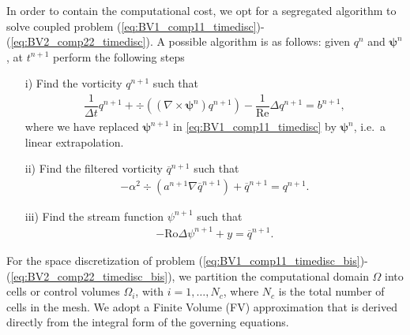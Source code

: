\documentclass[11pt,a4paper]{article}
\begin{document}
In order to contain the computational cost, we opt for a segregated algorithm to solve coupled problem 
(\ref{eq:BV1_comp11_timedisc})-(\ref{eq:BV2_comp22_timedisc}). A possible algorithm is as follows:
given $q^n$ and $\bm{\psi}^n$, at $t^{n+1}$ perform the following steps
 \begin{itemize}
 \item[i)] Find the vorticity $q^{n+1}$ such that
 \begin{align}
\dfrac{1}{\Delta t} q^{n+1} + \div \left(\left(\nabla \times \bm{\psi}^n \right) q^{n+1} \right) - \dfrac{1}{\text{Re}} \Delta q^{n+1} = b^{n+1}, \label{eq:BV1_comp11_timedisc_bis} %
     \end{align}
where we have replaced $\bm{\psi}^{n+1}$ in \eqref{eq:BV1_comp11_timedisc} by $\bm{\psi}^n$, i.e.~a linear extrapolation. 
 \item[ii)] Find the filtered vorticity $\overline{q}^{n+1}$ such that
  \begin{align}
 -\alpha^2\div \left(a^{n+1} \nabla\overline{q}^{n+1}\right) + \overline{q}^{n+1} = q^{n+1}. \label{eq:BV2_comp33_timedisc_bis} 
 \end{align}
 \item[iii)] Find the stream function $\psi^{n+1}$ such that
 \begin{align}
 -\text{Ro} \Delta \psi^{n+1} + y = \overline{q}^{n+1}. \label{eq:BV2_comp22_timedisc_bis}
 \end{align}
 \end{itemize}
 
For the space discretization of problem (\ref{eq:BV1_comp11_timedisc_bis})-(\ref{eq:BV2_comp22_timedisc_bis}), 
we partition the computational domain $\Omega$ into cells or control volumes $\Omega_i$,
with $i = 1, \dots, N_{c}$, where $N_{c}$ is the total number of cells in the mesh. 
We adopt a Finite Volume (FV) approximation that is derived directly from the integral form of the governing equations. 
\end{document}
